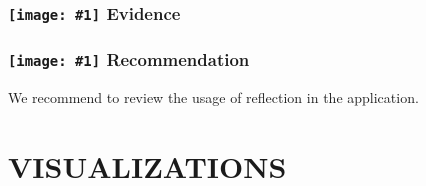 \documentclass[12p]{article}
\newcommand{\icon}[1]{\texttt{[image: \#1]}}
\begin{document}
\subsubsection*{\protect\icon{/home/miki/Documents/GITHUB/AndroidPermissions/python/vulns/report_icons/basic_magnifier.png} Evidence}

\subsubsection*{\protect\icon{/home/miki/Documents/GITHUB/AndroidPermissions/python/vulns/report_icons/basic_todo.png} Recommendation}
We recommend to review the usage of reflection in the application.
\cleardoublepage
\newpage
\section{VISUALIZATIONS}
\end{document}
